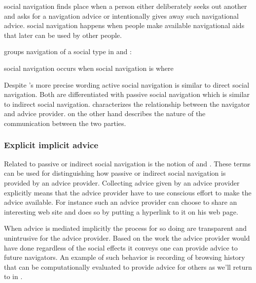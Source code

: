 \begin{items}
   social navigation finds place when a person either
    deliberately seeks out another and asks for a navigation advice or
    intentionally gives away such navigational advice.
   social navigation happens when people make available
    navigational aids that later can be used by other people.
\end{items}

\citeauthor{svensson03} groups navigation of a social type in
 and :

\begin{items}
   social navigation occurs when
   social navigation is where
\end{items}

Despite \citeauthor{svensson03}'s more precise wording active social
navigation is similar to direct social navigation. Both are differentiated
with passive social navigation which is similar to indirect social navigation.
\citeauthor{dieberger97} characterizes the relationship between the
navigator and advice provider. \citeauthor{svensson03} on the other hand
describes the nature of the communication between the two parties.

\subsubsection{Explicit \oldand implicit advice}
\label{section:social.navigation.fundamental.categorization.explicit.implicit}

Related to passive or indirect social navigation is the notion
of  and .
These terms can be used for distinguishing how
passive or indirect social navigation is provided by an advice provider.
Collecting advice given by an advice provider explicitly means that
the advice provider have to use conscious effort to make the advice available.
For instance such an advice provider can choose to share an interesting web
site and does so by putting a hyperlink to it on his web page.

When advice is mediated implicitly the process for so doing are transparent
and unintrusive for the advice provider. Based on the work the advice provider
would have done regardless of the social effects it conveys one can provide
advice to future navigators. An example of such behavior is recording of
browsing history that can be computationally evaluated to provide advice for
others as we'll return to in
.

